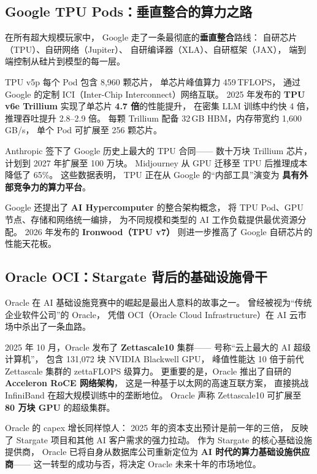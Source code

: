 \subsection{Google TPU Pods：垂直整合的算力之路}
\label{subsec:google-tpu}

在所有超大规模玩家中，
Google 走了一条最彻底的\textbf{垂直整合}路线：
自研芯片（TPU）、自研网络（Jupiter）、
自研编译器（XLA）、自研框架（JAX），
端到端控制从硅片到模型的每一层。

TPU v5p 每个 Pod 包含 8,960 颗芯片，
单芯片峰值算力 459\,TFLOPS，
通过 Google 的定制 ICI（Inter-Chip Interconnect）网络互联。
2025 年发布的 \textbf{TPU v6e Trillium} 实现了单芯片 \textbf{4.7 倍}的性能提升，
在密集 LLM 训练中约快 4 倍，
推理吞吐提升 2.8--2.9 倍。
每颗 Trillium 配备 32\,GB HBM，内存带宽约 1,600\,GB/s，
单个 Pod 可扩展至 256 颗芯片。

Anthropic 签下了 Google 历史上最大的 TPU 合同——
数十万块 Trillium 芯片，计划到 2027 年扩展至 100 万块。
Midjourney 从 GPU 迁移至 TPU 后推理成本降低了 65\%。
这些数据表明，
TPU 正在从 Google 的``内部工具''演变为
\textbf{具有外部竞争力的算力平台}。

Google 还提出了 \textbf{AI Hypercomputer} 的整合架构概念，
将 TPU Pod、GPU 节点、存储和网络统一编排，
为不同规模和类型的 AI 工作负载提供最优资源分配。
2026 年发布的 \textbf{Ironwood（TPU v7）}
则进一步推高了 Google 自研芯片的性能天花板。

\subsection{Oracle OCI：Stargate 背后的基础设施骨干}
\label{subsec:oracle-oci}

Oracle 在 AI 基础设施竞赛中的崛起是最出人意料的故事之一。
曾经被视为``传统企业软件公司''的 Oracle，
凭借 OCI（Oracle Cloud Infrastructure）在 AI 云市场中杀出了一条血路。

2025 年 10 月，Oracle 发布了 \textbf{Zettascale10} 集群——
号称``云上最大的 AI 超级计算机''，
包含 131,072 块 NVIDIA Blackwell GPU，
峰值性能达 10 倍于前代 Zettascale 集群的 zettaFLOPS 级算力。
更重要的是，Oracle 推出了自研的 \textbf{Acceleron RoCE 网络架构}，
这是一种基于以太网的高速互联方案，
直接挑战 InfiniBand 在超大规模训练中的垄断地位。
Oracle 声称 Zettascale10 可扩展至 \textbf{80 万块 GPU} 的超级集群。

Oracle 的 capex 增长同样惊人：
2025 年的资本支出预计是前一年的三倍，
反映了 Stargate 项目和其他 AI 客户需求的强力拉动。
作为 Stargate 的核心基础设施提供商，
Oracle 已将自身从数据库公司重新定位为
\textbf{AI 时代的算力基础设施供应商}——
这一转型的成功与否，将决定 Oracle 未来十年的市场地位。

